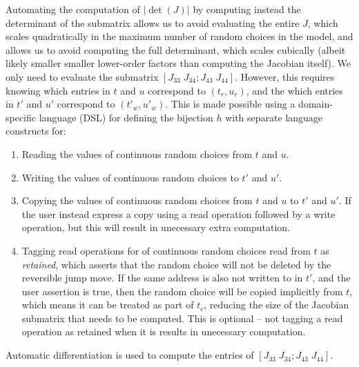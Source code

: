 \documentclass{article}
\begin{document}
Automating the computation of $|\det(J)|$ by computing instead the determinant of the submatrix allows us to avoid evaluating the entire $J$, which scales quadratically in the maximum number of random choices in the model, and allows us to avoid computing the full determinant, which scales cubically (albeit likely smaller smaller lower-order factors than computing the Jacobian itself).
We only need to evaluate the submatrix $[J_{33} \; J_{34}; J_{43} \; J_{44}]$.
However, this requires knowing which entries in $t$ and $u$ correspond to $(t_r, u_r)$, and the which entries in $t'$ and $u'$ correspond to $(t'_w, u'_w)$.
This is made possible using a domain-specific language (DSL) for defining the bijection $h$ with separate language constructs for:
\begin{enumerate}
\item Reading the values of continuous random choices from $t$ and $u$.
\item Writing the values of continuous random choices to $t'$ and $u'$.
\item Copying the values of continuous random choices from $t$ and $u$ to $t'$ and $u'$.
If the user instead express a copy using a read operation followed by a write operation, but this will result in unecessary extra computation.
\item Tagging read operations for of continuous random choices read from $t$ as \emph{retained}, which asserts that the random choice will not be deleted by the reversible jump move.
If the same address is also not written to in $t'$, and the user assertion is true, then the random choice will be copied implicitly from $t$, which means it can be treated as part of $t_c$, reducing the size of the Jacobian submatrix that needs to be computed.
This is optional -- not tagging a read operation as retained when it is results in unecessary computation.
\end{enumerate}
Automatic differentiation is used to compute the entries of $[J_{33} \; J_{34}; J_{43} \; J_{44}]$.
\end{document}
